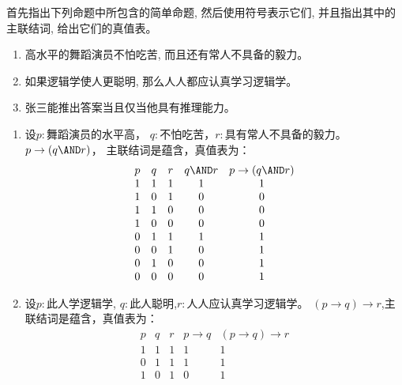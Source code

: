 \documentclass{ctexart}
\begin{document}
\begin{problem}\label{pro:6}

  首先指出下列命题中所包含的简单命题, 然后使用符号表示它们, 并且指出其中的主联结词, 给出它们的真值表。
  \begin{enumerate}
    \item 高水平的舞蹈演员不怕吃苦, 而且还有常人不具备的毅力。
    \item 如果逻辑学使人更聪明, 那么人人都应认真学习逻辑学。
    \item 张三能推出答案当且仅当他具有推理能力。
  \end{enumerate}

\end{problem}
\begin{solution}
  \begin{enumerate}
    \item 设\(p:\text{舞蹈演员的水平高}\)， \(q: \text{不怕吃苦}\)，\(r : \text{具有常人不具备的毅力}\)。
      \(p \to (q \AND r)\)， 主联结词是蕴含，真值表为：
      \[
        \begin{matrix}
          p & q & r & q \AND r & p \to (q \AND r) \\
          1 & 1 & 1 & 1        & 1                \\
          1 & 0 & 1 & 0        & 0                \\
          1 & 1 & 0 & 0        & 0                \\
          1 & 0 & 0 & 0        & 0                \\
          0 & 1 & 1 & 1        & 1                \\
          0 & 0 & 1 & 0        & 1                \\
          0 & 1 & 0 & 0        & 1                \\
          0 & 0 & 0 & 0        & 1                \\
        \end{matrix}
      \]
    \item 设\(p:\text{此人学逻辑学}\), \(q:\text{此人聪明}\),\(r: \text{人人应认真学习逻辑学}\)。
      \((p \to q)\to r\),主联结词是蕴含，真值表为：
      \[
        \begin{matrix}
          p & q & r & p \to q & (p \to q) \to r \\
          1 & 1 & 1 & 1       & 1               \\
          0 & 1 & 1 & 1       & 1               \\
          1 & 0 & 1 & 0       & 1               \\

\end{matrix}\]
\end{enumerate}
\end{solution}
\end{document}

